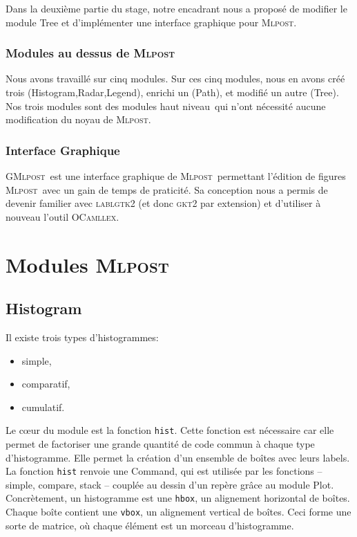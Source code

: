 \documentclass[a4paper,12pt]{article}
\newcommand{\mlpost}{\textsc{Mlpost}}
\newcommand{\gmlpost}{\textsc{GMlpost}}
\begin{document}
Dans la deuxième partie du stage, notre encadrant nous a proposé de modifier le module Tree et d'implémenter une interface graphique pour \mlpost.

\subsubsection{Modules au dessus de \mlpost}
Nous avons travaillé sur cinq modules. 
Sur ces cinq modules, nous en avons créé trois (Histogram,Radar,Legend), enrichi un (Path), et modifié un autre (Tree).
Nos trois modules sont des modules \og haut niveau\fg\ qui n'ont nécessité aucune modification du noyau de \mlpost. 
\subsubsection{Interface Graphique}
\gmlpost\ est une interface graphique de \mlpost\ permettant l'édition de figures \mlpost\ avec un gain de temps de praticité. Sa conception nous a permis de devenir familier avec \textsc{lablgtk2} (et donc \textsc{gkt2} par extension) et d'utiliser à nouveau l'outil \textsc{OCamllex}.

\section{Modules \mlpost}

\subsection{Histogram}
Il existe trois types d'histogrammes:
\begin{itemize}
\item simple,
\item comparatif,
\item cumulatif.
\end{itemize}
\bigskip 

Le c\oe ur du module est la fonction  \texttt{hist}. Cette fonction est nécessaire car elle permet de factoriser une grande quantité de code commun à chaque type d'histogramme. Elle permet la création d'un ensemble de boîtes avec leurs labels. La fonction \texttt{hist} renvoie une Command, qui est utilisée par les fonctions -- simple, compare, stack -- couplée au dessin d'un repère grâce au module Plot.
Concrètement, un histogramme est une \texttt{hbox}, un alignement horizontal de boîtes. Chaque boîte contient une \texttt{vbox}, un alignement vertical de boîtes. Ceci forme une sorte de matrice, où chaque élément est un morceau d'histogramme.
\end{document}
